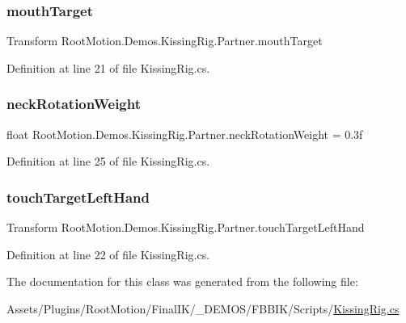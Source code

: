 \subsubsection{\texorpdfstring{mouth\+Target}{mouthTarget}}
{\footnotesize\ttfamily Transform Root\+Motion.\+Demos.\+Kissing\+Rig.\+Partner.\+mouth\+Target}



Definition at line 21 of file Kissing\+Rig.\+cs.

\mbox{\label{class_root_motion_1_1_demos_1_1_kissing_rig_1_1_partner_add59fc99897714cffc7b847ff8bde033}} 
\subsubsection{\texorpdfstring{neck\+Rotation\+Weight}{neckRotationWeight}}
{\footnotesize\ttfamily float Root\+Motion.\+Demos.\+Kissing\+Rig.\+Partner.\+neck\+Rotation\+Weight = 0.\+3f}



Definition at line 25 of file Kissing\+Rig.\+cs.

\mbox{\label{class_root_motion_1_1_demos_1_1_kissing_rig_1_1_partner_a8b618d3c8478a8d8ecb0c20f56006145}} 
\subsubsection{\texorpdfstring{touch\+Target\+Left\+Hand}{touchTargetLeftHand}}
{\footnotesize\ttfamily Transform Root\+Motion.\+Demos.\+Kissing\+Rig.\+Partner.\+touch\+Target\+Left\+Hand}



Definition at line 22 of file Kissing\+Rig.\+cs.



The documentation for this class was generated from the following file\+:\begin{DoxyCompactItemize}
\item 
Assets/\+Plugins/\+Root\+Motion/\+Final\+I\+K/\+\_\+\+D\+E\+M\+O\+S/\+F\+B\+B\+I\+K/\+Scripts/\mbox{\hyperlink{_kissing_rig_8cs}{Kissing\+Rig.\+cs}}\end{DoxyCompactItemize}
